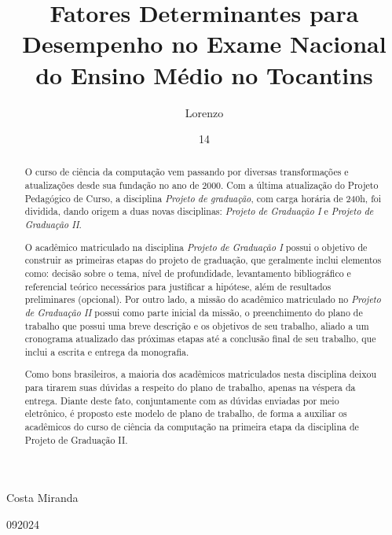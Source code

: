 \documentclass[tcc1,project]{uftex}
\begin{document}
  \title{Fatores Determinantes para Desempenho no Exame Nacional do Ensino Médio no Tocantins}
  \author{Lorenzo}{Costa Miranda}

  \date{14}{09}{2024}

  

  \maketitle

  \begin{abstract}
O curso de ciência da computação vem passando por diversas transformações e atualizações desde sua fundação no ano de 2000. Com a última atualização do Projeto Pedagógico de Curso, a disciplina \textit{Projeto de graduação}, com carga horária de 240h, foi dividida, dando origem a duas novas disciplinas: \textit{Projeto de Graduação I} e \textit{Projeto de Graduação II}. 

O acadêmico matriculado na disciplina \textit{Projeto de Graduação I} possui o objetivo de construir as primeiras etapas do projeto de graduação, que geralmente inclui elementos como: decisão sobre o tema, nível de profundidade, levantamento bibliográfico e referencial teórico necessários para justificar a hipótese, além de resultados preliminares (opcional). Por outro lado, a missão do acadêmico matriculado no \textit{Projeto de Graduação II} possui como parte inicial da missão, o preenchimento do plano de trabalho que possui uma breve descrição e os objetivos de  seu trabalho, aliado a um cronograma atualizado das próximas etapas até a conclusão final de seu trabalho, que inclui a escrita e entrega da monografia.

Como bons brasileiros, a maioria dos acadêmicos matriculados nesta disciplina deixou para tirarem suas dúvidas a respeito do plano de trabalho, apenas na véspera da entrega. Diante deste fato, conjuntamente com as dúvidas enviadas por meio eletrônico, é proposto este modelo de plano de trabalho, de forma a auxiliar os acadêmicos do curso de ciência da computação na primeira etapa da disciplina de Projeto de Graduação II.

 \end{abstract}
\end{document}
